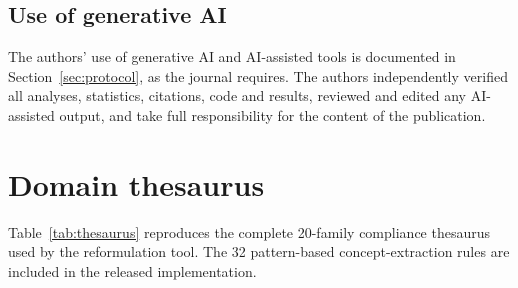 \documentclass[smallextended,natbib]{svjour3}
\begin{document}
\subsection*{Use of generative AI}
The authors' use of generative AI and AI-assisted tools is documented in
Section~\ref{sec:protocol}, as the journal requires. The authors
independently verified all analyses, statistics, citations, code and results,
reviewed and edited any AI-assisted output, and take full responsibility for
the content of the publication.


\appendix
\section{Domain thesaurus}
\label{app:thesaurus}

Table~\ref{tab:thesaurus} reproduces the complete 20-family compliance thesaurus used by the reformulation tool.
The 32 pattern-based concept-extraction rules are included in the released implementation.
\end{document}
